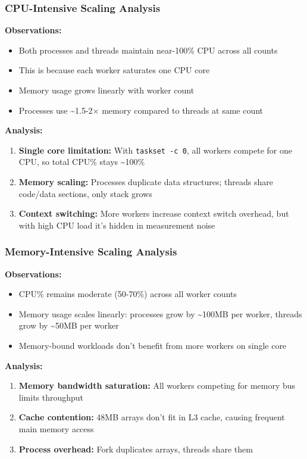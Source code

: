 \documentclass[12pt,a4paper]{article}
\begin{document}
\subsubsection{CPU-Intensive Scaling Analysis}

\textbf{Observations:}
\begin{itemize}
    \item Both processes and threads maintain near-100\% CPU across all counts
    \item This is because each worker saturates one CPU core
    \item Memory usage grows linearly with worker count
    \item Processes use \textasciitilde1.5-2× memory compared to threads at same count
\end{itemize}

\textbf{Analysis:}
\begin{enumerate}
    \item \textbf{Single core limitation:} With \texttt{taskset -c 0}, all workers
    compete for one CPU, so total CPU\% stays \textasciitilde100\%
    \item \textbf{Memory scaling:} Processes duplicate data structures; threads share
    code/data sections, only stack grows
    \item \textbf{Context switching:} More workers increase context switch overhead,
    but with high CPU load it's hidden in measurement noise
\end{enumerate}

\subsubsection{Memory-Intensive Scaling Analysis}

\textbf{Observations:}
\begin{itemize}
    \item CPU\% remains moderate (50-70\%) across all worker counts
    \item Memory usage scales linearly: processes grow by \textasciitilde100MB per worker,
    threads grow by \textasciitilde50MB per worker
    \item Memory-bound workloads don't benefit from more workers on single core
\end{itemize}

\textbf{Analysis:}
\begin{enumerate}
    \item \textbf{Memory bandwidth saturation:} All workers competing for memory
    bus limits throughput
    \item \textbf{Cache contention:} 48MB arrays don't fit in L3 cache, causing
    frequent main memory access
    \item \textbf{Process overhead:} Fork duplicates arrays, threads share them
\end{enumerate}
\end{document}
